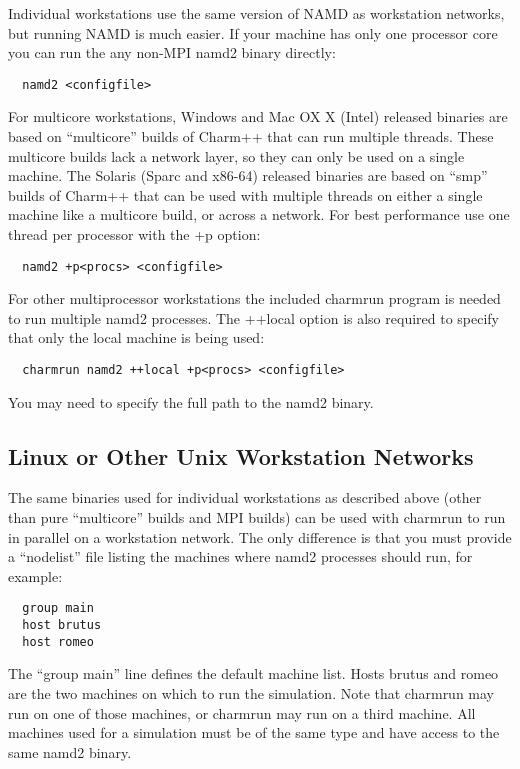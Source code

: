 Individual workstations use the same version of NAMD as workstation
networks, but running NAMD is much easier.  If your machine has only
one processor core you can run the any non-MPI namd2 binary directly:

\begin{verbatim}
  namd2 <configfile>
\end{verbatim}

For multicore workstations, Windows and Mac OX X (Intel) released binaries
are based on ``multicore'' builds of Charm++ that can run multiple threads.
These multicore builds lack a network layer, so they can only be used on a
single machine.
The Solaris (Sparc and x86-64) released binaries are based on ``smp''
builds of Charm++ that can be used with multiple threads on either a
single machine like a multicore build, or across a network.
For best performance use one thread per processor with the +p option:

\begin{verbatim}
  namd2 +p<procs> <configfile>
\end{verbatim}

For other multiprocessor workstations the included charmrun program is
needed to run multiple namd2 processes.  The ++local option is also
required to specify that only the local machine is being used:

\begin{verbatim}
  charmrun namd2 ++local +p<procs> <configfile>
\end{verbatim}

You may need to specify the full path to the namd2 binary.

\subsection{Linux or Other Unix Workstation Networks}

The same binaries used for individual workstations as described above
(other than pure ``multicore'' builds and MPI builds)
can be used with charmrun to run in parallel on a workstation network.
The only difference is that you must provide a ``nodelist'' file listing
the machines where namd2 processes should run, for example:

\begin{verbatim}
  group main
  host brutus
  host romeo
\end{verbatim}

The ``group main'' line defines the default machine list.  Hosts brutus
and romeo are the two machines on which to run the simulation.  Note
that charmrun may run on one of those machines, or charmrun may run
on a third machine.  All machines used for a simulation must be of the
same type and have access to the same namd2 binary.


